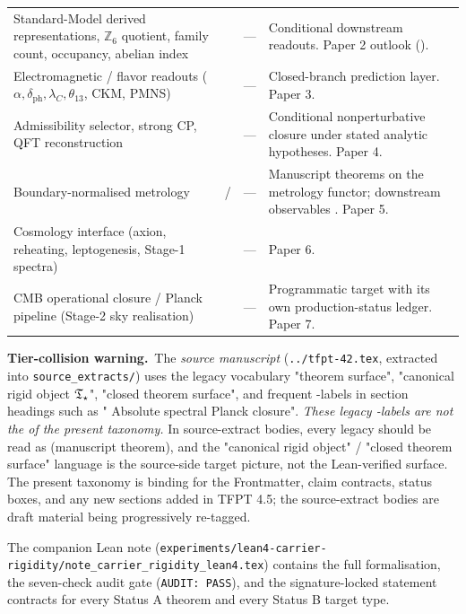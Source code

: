 \documentclass[11pt,a4paper]{article}
\begin{document}
\begin{center}
\begin{tabularx}{\textwidth}{@{}p{}p{}p{}Y@{}}
Standard-Model derived representations,
  $\mathbb Z_6$ quotient, family count, occupancy, abelian index
  & 
  & ---
  & Conditional downstream readouts. Paper 2  outlook (). \\
Electromagnetic / flavor readouts
  ($\alpha,\delta_{\mathrm{ph}},\lambda_C,\theta_{13}$, CKM, PMNS)
  & 
  & ---
  & Closed-branch prediction layer. Paper 3. \\
Admissibility selector, strong CP, QFT reconstruction
  & 
  & ---
  & Conditional nonperturbative closure under stated analytic hypotheses. Paper 4. \\
Boundary-normalised metrology
  & /
  & ---
  & Manuscript theorems on the metrology functor; downstream observables . Paper 5. \\
Cosmology interface (axion, reheating, leptogenesis, Stage-1 spectra)
  & 
  & ---
  & Paper 6. \\
CMB operational closure / Planck pipeline (Stage-2 sky realisation)
  & 
  & ---
  & Programmatic target with its own production-status ledger. Paper 7. \\
\bottomrule
\end{tabularx}
\end{center}

\medskip
\noindent
\textbf{Tier-collision warning.}\ The \emph{source manuscript}
(\texttt{../tfpt-42.tex}, extracted into \texttt{source\_extracts/})
uses the legacy vocabulary "theorem surface", "canonical rigid
object $\mathfrak T_{\star}$", "closed theorem surface", and frequent
-labels in section headings such as
" Absolute spectral Planck closure". \emph{These legacy
-labels are not the  of the present taxonomy.}
In source-extract bodies, every legacy  should be read
as  (manuscript theorem), and the "canonical rigid
object" / "closed theorem surface" language is the source-side
target picture, not the Lean-verified surface. The present
taxonomy is binding for the Frontmatter, claim contracts,
status boxes, and any new sections added in TFPT 4.5; the
source-extract bodies are draft material being progressively
re-tagged.

\noindent
The companion Lean note
(\texttt{experiments/lean4-carrier-rigidity/note\_carrier\_rigidity\_lean4.tex})
contains the full formalisation, the seven-check audit gate
(\texttt{AUDIT:~PASS}), and the signature-locked statement
contracts for every Status A theorem and every Status B
target type.
\end{document}
